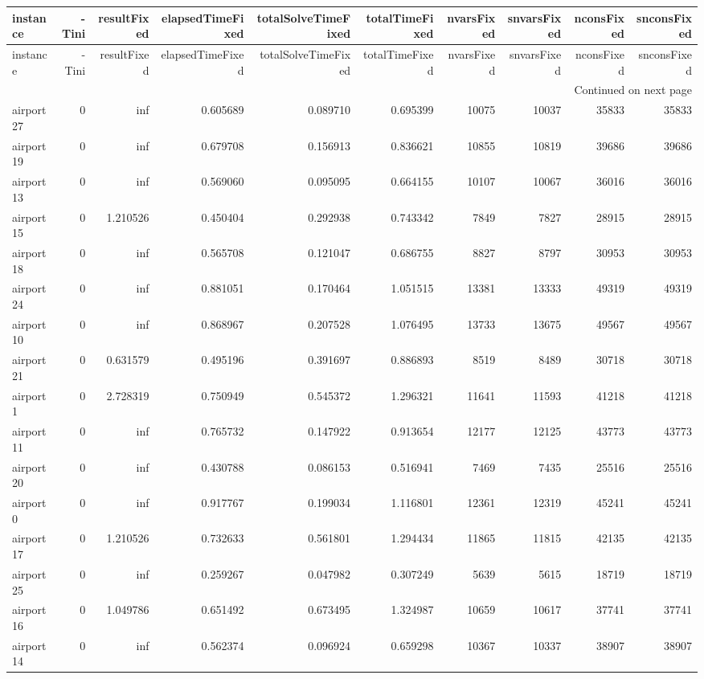 \begin{longtable}{|l|r|r|r|r|r|r|r|r|r|}
\toprule
instance & -Tini & resultFixed & elapsedTimeFixed & totalSolveTimeFixed & totalTimeFixed & nvarsFixed & snvarsFixed & nconsFixed & snconsFixed \\
\midrule
\endfirsthead
\toprule
instance & -Tini & resultFixed & elapsedTimeFixed & totalSolveTimeFixed & totalTimeFixed & nvarsFixed & snvarsFixed & nconsFixed & snconsFixed \\
\midrule
\endhead
\midrule
\multicolumn{10}{r}{Continued on next page} \\
\midrule
\endfoot
\bottomrule
\endlastfoot
airport27 & 0 & inf & 0.605689 & 0.089710 & 0.695399 & 10075 & 10037 & 35833 & 35833 \\
airport19 & 0 & inf & 0.679708 & 0.156913 & 0.836621 & 10855 & 10819 & 39686 & 39686 \\
airport13 & 0 & inf & 0.569060 & 0.095095 & 0.664155 & 10107 & 10067 & 36016 & 36016 \\
airport15 & 0 & 1.210526 & 0.450404 & 0.292938 & 0.743342 & 7849 & 7827 & 28915 & 28915 \\
airport18 & 0 & inf & 0.565708 & 0.121047 & 0.686755 & 8827 & 8797 & 30953 & 30953 \\
airport24 & 0 & inf & 0.881051 & 0.170464 & 1.051515 & 13381 & 13333 & 49319 & 49319 \\
airport10 & 0 & inf & 0.868967 & 0.207528 & 1.076495 & 13733 & 13675 & 49567 & 49567 \\
airport21 & 0 & 0.631579 & 0.495196 & 0.391697 & 0.886893 & 8519 & 8489 & 30718 & 30718 \\
airport1 & 0 & 2.728319 & 0.750949 & 0.545372 & 1.296321 & 11641 & 11593 & 41218 & 41218 \\
airport11 & 0 & inf & 0.765732 & 0.147922 & 0.913654 & 12177 & 12125 & 43773 & 43773 \\
airport20 & 0 & inf & 0.430788 & 0.086153 & 0.516941 & 7469 & 7435 & 25516 & 25516 \\
airport0 & 0 & inf & 0.917767 & 0.199034 & 1.116801 & 12361 & 12319 & 45241 & 45241 \\
airport17 & 0 & 1.210526 & 0.732633 & 0.561801 & 1.294434 & 11865 & 11815 & 42135 & 42135 \\
airport25 & 0 & inf & 0.259267 & 0.047982 & 0.307249 & 5639 & 5615 & 18719 & 18719 \\
airport16 & 0 & 1.049786 & 0.651492 & 0.673495 & 1.324987 & 10659 & 10617 & 37741 & 37741 \\
airport14 & 0 & inf & 0.562374 & 0.096924 & 0.659298 & 10367 & 10337 & 38907 & 38907 \\

\end{longtable}
